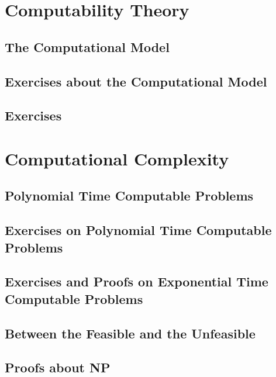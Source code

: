 \documentclass{article}
\begin{document}
		
		
		
		
		
		
		
		
		
		
		
		
		
		
		
		
		
		
		
		
		
		
		
		
	\cleardoublepage
	\section{Computability Theory}
		\subsection{The Computational Model}
		\subsection{Exercises about the Computational Model}
		\subsection{Exercises}

	\cleardoublepage
	\section{Computational Complexity}
		\subsection{Polynomial Time Computable Problems}
		\subsection{Exercises on Polynomial Time Computable Problems}
		\subsection{Exercises and Proofs on Exponential Time Computable Problems}
		\subsection{Between the Feasible and the Unfeasible}
		\subsection{Proofs about NP}
\end{document}
